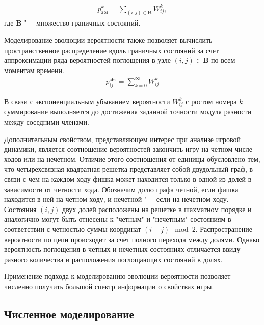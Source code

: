 \begin{equation}
    \begin{aligned}
    p_\mathsf{abs}^{k}=\sum_{(i, j) \in \boldsymbol{B}} W_{ij}^{k},
    \label{eq:timedistr}
    \end{aligned}
\end{equation}
где $\textbf{B}$ "--- множество граничных состояний.

Моделирование эволюции вероятности также позволяет вычислить пространственное распределение вдоль граничных состояний за
счет аппроксимации ряда вероятностей поглощения в узле $(i, j) \in \boldsymbol{B}$ по всем моментам времени.
\begin{equation}
    \begin{aligned}
    p_{ij}^\mathsf{abs}=\sum_{k=0}^{\infty} W_{ij}^{k}
    \label{eq:spacedistr}
    \end{aligned}
\end{equation}

В связи с экспоненциальным убыванием вероятности $W_{ij}^{k}$ с ростом номера $k$ суммирование выполняется до достижения заданной точности
модуля разности между соседними членами.

Дополнительным свойством, представляющем интерес при анализе игровой динамики, является соотношение вероятностей
закончить игру на четном числе ходов или на нечетном. Отличие этого соотношения от единицы обусловлено 
тем, что четырехсвязная квадратная решетка представляет собой двудольный граф,
в связи с чем на каждом ходу фишка может находится только в одной из долей в зависимости от четности хода.
Обозначим долю графа четной, если фишка находится в ней на четном ходу, и нечетной "--- если на нечетном ходу.
Состояния $(i, j)$ двух долей расположены на решетке в шахматном порядке и аналогично могут быть отнесены
к "четным" и "нечетным" состояниям в соответствии с четностью суммы координат $(i + j) \mod 2$.
Распространение вероятности по цепи происходит за счет полного перехода между долями. 
Однако вероятность поглощения в четных и нечетных состояниях отличается ввиду разного количества и расположения поглощающих состояний в долях.

Применение подхода к моделированию эволюции вероятности позволяет численно получить большой спектр информации о свойствах игры.

\subsection{Численное моделирование}\label{subsec:ch1/sec3/sub4}

